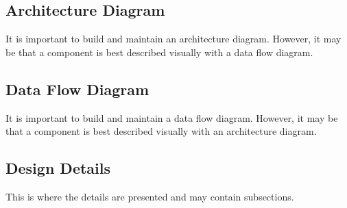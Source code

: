 \subsection{ Architecture  Diagram}
It is important to build and maintain an architecture diagram.  However, it may 
be that a component is best described visually with a data flow diagram. 


\subsection{Data Flow Diagram}
It is important to build and maintain a data flow diagram.  However, it may be 
that a component is best described visually with an architecture diagram. 


\subsection{Design Details}
This is where the details are presented and may contain subsections. 


